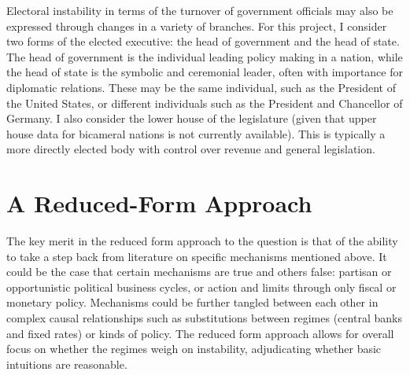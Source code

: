 \documentclass{article}
\begin{document}
    Electoral instability in terms of the turnover of government officials may also be expressed through changes in a variety of branches. For this project, I consider two forms of the elected executive: the head of government and the head of state. The head of government is the individual leading policy making in a nation, while the head of state is the symbolic and ceremonial leader, often with importance for diplomatic relations. These may be the same individual, such as the President of the United States, or different individuals such as the President and Chancellor of Germany. I also consider the lower house of the legislature (given that upper house data for bicameral nations is not currently available). This is typically a more directly elected body with control over revenue and general legislation.

    \section*{A Reduced-Form Approach}

    The key merit in the reduced form approach to the question is that of the ability to take a step back from literature on specific mechanisms mentioned above. It could be the case that certain mechanisms are true and others false: partisan or opportunistic political business cycles, or action and limits through only fiscal or monetary policy. Mechanisms could be further tangled between each other in complex causal relationships such as substitutions between regimes (central banks and fixed rates) or kinds of policy. The reduced form approach allows for overall focus on whether the regimes weigh on instability, adjudicating whether basic intuitions are reasonable.
\end{document}
